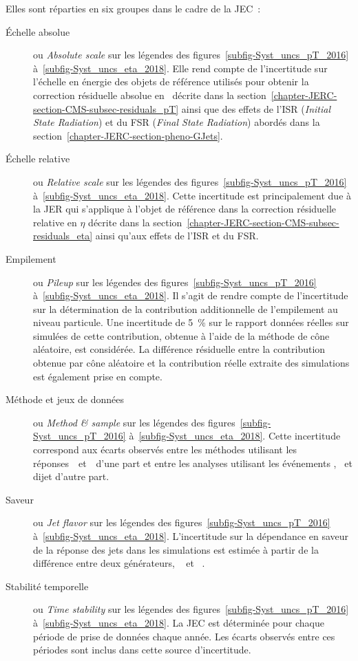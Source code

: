 Elles sont réparties en six groupes dans le cadre de la JEC~\cite{CMS-DP-2020-019}:
\begin{description}
\item[Échelle absolue] ou \emph{Absolute scale} sur les légendes des figures~\ref{subfig-Syst_uncs_pT_2016} à~\ref{subfig-Syst_uncs_eta_2018}.
Elle rend compte de l'incertitude sur l'échelle en énergie des objets de référence utilisés pour obtenir la correction résiduelle absolue en \pT\ décrite dans la section~\ref{chapter-JERC-section-CMS-subsec-residuals_pT} ainsi que des effets de l'ISR (\emph{Initial State Radiation}) et du FSR (\emph{Final State Radiation}) abordés dans la section~\ref{chapter-JERC-section-pheno-GJets}.
\item[Échelle relative] ou \emph{Relative scale} sur les légendes des figures~\ref{subfig-Syst_uncs_pT_2016} à~\ref{subfig-Syst_uncs_eta_2018}.
Cette incertitude est principalement due à la JER qui s'applique à l'objet de référence dans la correction résiduelle relative en $\eta$ décrite dans la section~\ref{chapter-JERC-section-CMS-subsec-residuals_eta} ainsi qu'aux effets de l'ISR et du FSR.
\item[Empilement] ou \emph{Pileup} sur les légendes des figures~\ref{subfig-Syst_uncs_pT_2016} à~\ref{subfig-Syst_uncs_eta_2018}.
Il s'agit de rendre compte de l'incertitude sur la détermination de la contribution additionnelle de l'empilement au niveau particule.
Une incertitude de \SI{5}{\%} sur le rapport données réelles sur simulées de cette contribution, obtenue à l'aide de la méthode de cône aléatoire, est considérée.
La différence résiduelle entre la contribution obtenue par cône aléatoire et la contribution réelle extraite des simulations est également prise en compte.
\item[Méthode et jeux de données] ou \emph{Method \& sample} sur les légendes des figures~\ref{subfig-Syst_uncs_pT_2016} à~\ref{subfig-Syst_uncs_eta_2018}.
Cette incertitude correspond aux écarts observés entre les méthodes utilisant les réponses~\Rbal\ et~\RMPF\ d'une part et entre les analyses utilisant les événements \Zjets, \Gjets\ et dijet d'autre part.
\item[Saveur] ou \emph{Jet flavor} sur les légendes des figures~\ref{subfig-Syst_uncs_pT_2016} à~\ref{subfig-Syst_uncs_eta_2018}.
L'incertitude sur la dépendance en saveur de la réponse des jets dans les simulations est estimée à partir de la différence entre deux générateurs,
\PYTHIA~\cite{pythia6.4}
et
\HERWIG~\cite{herwig}.
\item[Stabilité temporelle] ou \emph{Time stability} sur les légendes des figures~\ref{subfig-Syst_uncs_pT_2016} à~\ref{subfig-Syst_uncs_eta_2018}.
La JEC est déterminée pour chaque période de prise de données chaque année. Les écarts observés entre ces périodes sont inclus dans cette source d'incertitude.
\end{description}

